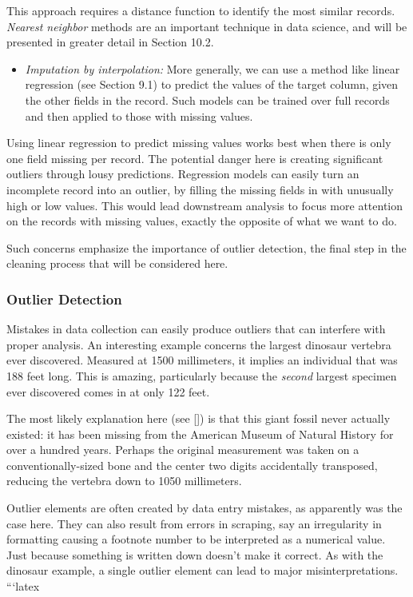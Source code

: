 \documentclass[10pt]{article}
\begin{document}
This approach requires a distance function to identify the most similar records. \emph{Nearest neighbor} methods are an important technique in data science, and will be presented in greater detail in Section 10.2.

\begin{itemize}
  \item \emph{Imputation by interpolation:} More generally, we can use a method like linear regression (see Section 9.1) to predict the values of the target column, given the other fields in the record. Such models can be trained over full records and then applied to those with missing values.
\end{itemize}

Using linear regression to predict missing values works best when there is only one field missing per record. The potential danger here is creating significant outliers through lousy predictions. Regression models can easily turn an incomplete record into an outlier, by filling the missing fields in with unusually high or low values. This would lead downstream analysis to focus more attention on the records with missing values, exactly the opposite of what we want to do.

Such concerns emphasize the importance of outlier detection, the final step in the cleaning process that will be considered here.

\subsubsection{Outlier Detection}
Mistakes in data collection can easily produce outliers that can interfere with proper analysis. An interesting example concerns the largest dinosaur vertebra ever discovered. Measured at 1500 millimeters, it implies an individual that was 188 feet long. This is amazing, particularly because the \emph{second} largest specimen ever discovered comes in at only 122 feet.

The most likely explanation here (see [\cite{goldenberg2016biggest}]) is that this giant fossil never actually existed: it has been missing from the American Museum of Natural History for over a hundred years. Perhaps the original measurement was taken on a conventionally-sized bone and the center two digits accidentally transposed, reducing the vertebra down to 1050 millimeters.

Outlier elements are often created by data entry mistakes, as apparently was the case here. They can also result from errors in scraping, say an irregularity in formatting causing a footnote number to be interpreted as a numerical value. Just because something is written down doesn't make it correct. As with the dinosaur example, a single outlier element can lead to major misinterpretations.
```latex
\end{document}
